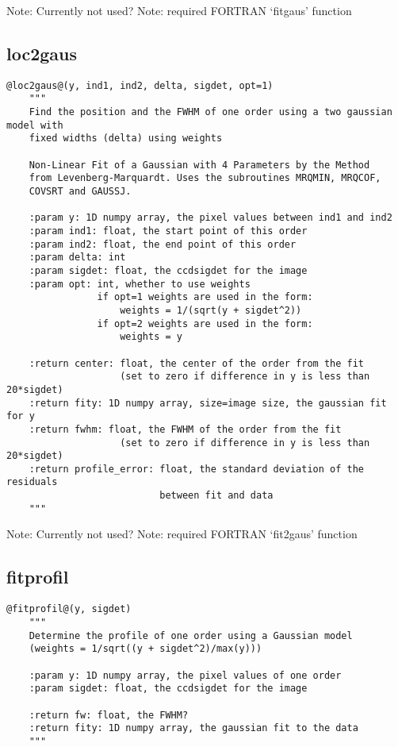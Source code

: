 \noindent Note: Currently not used?
\noindent Note: required FORTRAN `fitgaus' function

\vspace{0.5cm}
\subsection{loc2gaus}
\begin{lstlisting}[style=pythonstyle]
@loc2gaus@(y, ind1, ind2, delta, sigdet, opt=1)
    """
    Find the position and the FWHM of one order using a two gaussian model with
    fixed widths (delta) using weights

    Non-Linear Fit of a Gaussian with 4 Parameters by the Method
    from Levenberg-Marquardt. Uses the subroutines MRQMIN, MRQCOF,
    COVSRT and GAUSSJ.

    :param y: 1D numpy array, the pixel values between ind1 and ind2
    :param ind1: float, the start point of this order
    :param ind2: float, the end point of this order
    :param delta: int
    :param sigdet: float, the ccdsigdet for the image
    :param opt: int, whether to use weights
                if opt=1 weights are used in the form:
                    weights = 1/(sqrt(y + sigdet^2))
                if opt=2 weights are used in the form:
                    weights = y

    :return center: float, the center of the order from the fit
                    (set to zero if difference in y is less than 20*sigdet)
    :return fity: 1D numpy array, size=image size, the gaussian fit for y
    :return fwhm: float, the FWHM of the order from the fit
                    (set to zero if difference in y is less than 20*sigdet)
    :return profile_error: float, the standard deviation of the residuals
                           between fit and data
    """
\end{lstlisting}

\noindent Note: Currently not used?
\noindent Note: required FORTRAN `fit2gaus' function

\vspace{0.5cm}
\subsection{fitprofil}
\begin{lstlisting}[style=pythonstyle]
@fitprofil@(y, sigdet)
    """
    Determine the profile of one order using a Gaussian model 
    (weights = 1/sqrt((y + sigdet^2)/max(y)))
    
    :param y: 1D numpy array, the pixel values of one order
    :param sigdet: float, the ccdsigdet for the image
    
    :return fw: float, the FWHM?
    :return fity: 1D numpy array, the gaussian fit to the data
    """
\end{lstlisting}

